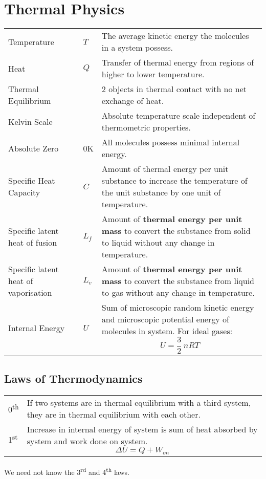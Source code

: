 \documentclass[a4paper]{article}
\begin{document}
	\section{Thermal Physics}
		\begin{center}
			\renewcommand{\arraystretch}{1.2}
			\begin{tabular}{@{} l l p{8.5cm} @{}}
				\toprule
				Temperature & $T$ & The average kinetic energy the molecules in a system possess. \\
				Heat & $Q$ & Transfer of thermal energy from regions of higher to lower temperature. \\
				Thermal Equilibrium & & 2 objects in thermal contact with no net exchange of heat. \\
				Kelvin Scale & & Absolute temperature scale independent of thermometric properties. \\
				Absolute Zero & 0K & All molecules possess minimal internal energy. \\
				Specific Heat Capacity & $C$ & Amount of thermal energy per unit substance to increase the temperature of the unit substance by one unit of temperature. \\
				Specific latent heat of fusion & $L_f$ & Amount of \textbf{thermal energy per unit mass} to convert the substance from solid to liquid without any change in temperature. \\
				Specific latent heat of vaporisation & $L_v$ & Amount of \textbf{thermal energy per unit mass} to convert the substance from liquid to gas without any change in temperature. \\
				Internal Energy & $U$ & Sum of microscopic random kinetic energy and microscopic potential energy of molecules in system. For ideal gases: $$U=\frac{3}{2}~nRT$$ \vspace*{-\baselineskip} \\ 
				\bottomrule
			\end{tabular}
		\end{center}
		\subsection{Laws of Thermodynamics}
			\begin{center}
				\renewcommand{\arraystretch}{1.2}
				\begin{tabular}{@{} l p{11cm} @{}}
					\toprule
					0\textsuperscript{th} & If two systems are in thermal equilibrium with a third system, they are in thermal equilibrium with each other. \\
					1\textsuperscript{st} & Increase in internal energy of system is sum of heat absorbed by system and work done on system. $$\Delta U = Q + W_{on}$$ \vspace*{-\baselineskip} \\
					\bottomrule
				\end{tabular}
			\end{center}
			We need not know the 3\textsuperscript{rd} and 4\textsuperscript{th} laws.
		\newpage
\end{document}
